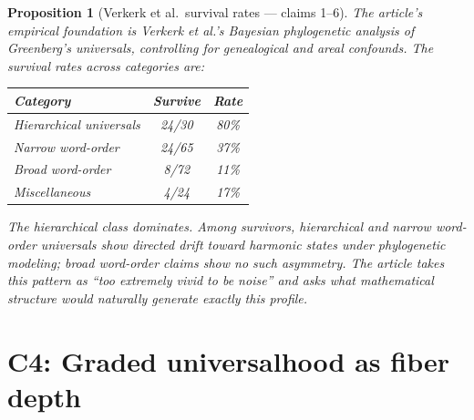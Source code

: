 \documentclass[11pt,a4paper]{article}
\newtheorem{proposition}[definition]{Proposition}
\begin{document}
\begin{proposition}[Verkerk et al.\ survival rates --- claims 1--6]
\label{prop:empirical}
The article's empirical foundation is Verkerk et al.'s Bayesian
phylogenetic analysis of Greenberg's universals, controlling for
genealogical and areal confounds. The survival rates across
categories are:

\begin{center}
\begin{tabular}{lcc}
\textbf{Category} & \textbf{Survive} & \textbf{Rate} \\
\hline
Hierarchical universals & 24/30 & 80\% \\
Narrow word-order & 24/65 & 37\% \\
Broad word-order & 8/72 & 11\% \\
Miscellaneous & 4/24 & 17\% \\
\end{tabular}
\end{center}

The hierarchical class dominates. Among survivors, hierarchical and
narrow word-order universals show directed drift toward harmonic
states under phylogenetic modeling; broad word-order claims show no
such asymmetry. The article takes this pattern as ``too extremely
vivid to be noise'' and asks what mathematical structure would
naturally generate exactly this profile.
\end{proposition}


\section{C4: Graded universalhood as fiber depth}
\label{sec:graded}
\end{document}
